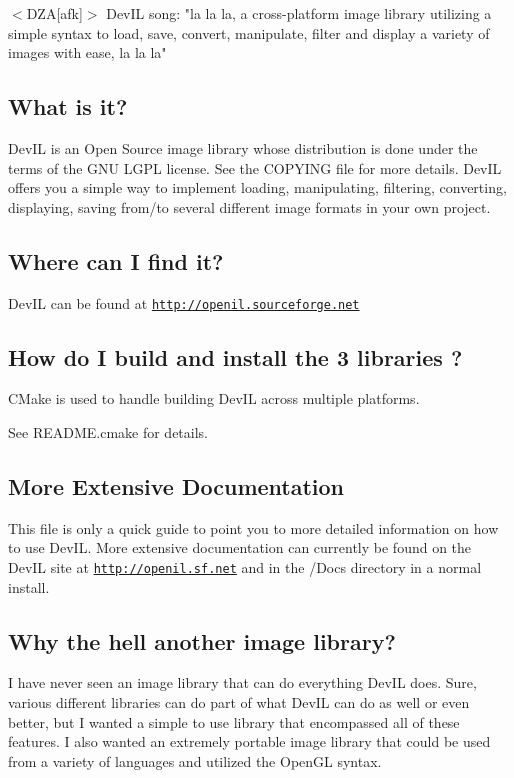 $<$D\+ZA\mbox{[}afk\mbox{]}$>$ Dev\+IL song\+: "la la la, a cross-\/platform image library utilizing a simple syntax to load, save, convert, manipulate, filter and display a variety of images with ease, la la la"

\subsection*{What is it? }

Dev\+IL is an Open Source image library whose distribution is done under the terms of the G\+NU L\+G\+PL license. See the C\+O\+P\+Y\+I\+NG file for more details. Dev\+IL offers you a simple way to implement loading, manipulating, filtering, converting, displaying, saving from/to several different image formats in your own project.

\subsection*{Where can I find it? }

Dev\+IL can be found at \href{http://openil.sourceforge.net}{\tt http\+://openil.\+sourceforge.\+net}

\subsection*{How do I build and install the 3 libraries ? }

C\+Make is used to handle building Dev\+IL across multiple platforms.

See R\+E\+A\+D\+M\+E.\+cmake for details.

\subsection*{More Extensive Documentation }

This file is only a quick guide to point you to more detailed information on how to use Dev\+IL. More extensive documentation can currently be found on the Dev\+IL site at \href{http://openil.sf.net}{\tt http\+://openil.\+sf.\+net} and in the /\+Docs directory in a normal install.

\subsection*{Why the hell another image library? }

I have never seen an image library that can do everything Dev\+IL does. Sure, various different libraries can do part of what Dev\+IL can do as well or even better, but I wanted a simple to use library that encompassed all of these features. I also wanted an extremely portable image library that could be used from a variety of languages and utilized the Open\+GL syntax.

